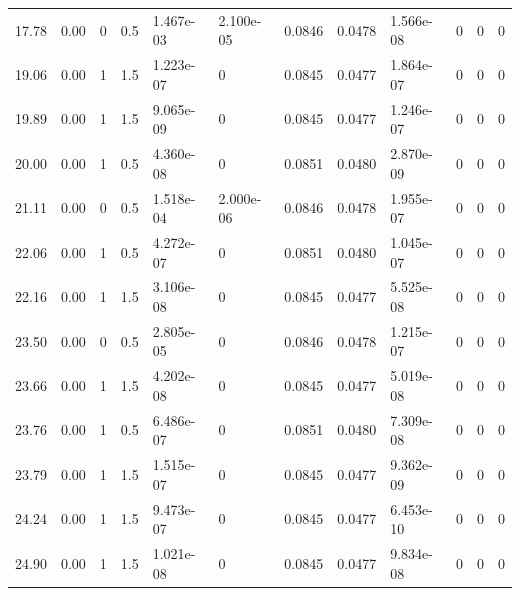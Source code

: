 \documentclass[preview]{standalone}
\begin{document}
{{\begin{tabular}{L{1.2cm}C{1.2cm} C{0.3cm}C{0.5cm} C{1.4cm}C{1.4cm} C{1.4cm}C{1.4cm} C{1.6cm}C{1.6cm} C{1.6cm}C{1.6cm}}
  17.78  &  0.00  & 0     & 0.5 &  1.467e-03  & 2.100e-05  &  0.0846&   0.0478& 1.566e-08 & 0   &  0 & 0  \\ 
  19.06  &  0.00  & 1     & 1.5 &  1.223e-07  & 0  &  0.0845&   0.0477& 1.864e-07 & 0   &  0 & 0  \\ 
  19.89  &  0.00  & 1     & 1.5 &  9.065e-09  & 0  &  0.0845&   0.0477& 1.246e-07 & 0   &  0 & 0  \\ 
  20.00  &  0.00  & 1     & 0.5 &  4.360e-08  & 0  &  0.0851&   0.0480& 2.870e-09 & 0   &  0 & 0  \\ 
  21.11  &  0.00  & 0     & 0.5 &  1.518e-04  & 2.000e-06  &  0.0846&   0.0478& 1.955e-07 & 0   &  0 & 0  \\ 
  22.06  &  0.00  & 1     & 0.5 &  4.272e-07  & 0  &  0.0851&   0.0480& 1.045e-07 & 0   &  0 & 0  \\ 
  22.16  &  0.00  & 1     & 1.5 &  3.106e-08  & 0  &  0.0845&   0.0477& 5.525e-08 & 0   &  0 & 0  \\ 
  23.50  &  0.00  & 0     & 0.5 &  2.805e-05  & 0  &  0.0846&   0.0478& 1.215e-07 & 0   &  0 & 0  \\ 
  23.66  &  0.00  & 1     & 1.5 &  4.202e-08  & 0  &  0.0845&   0.0477& 5.019e-08 & 0   &  0 & 0  \\ 
  23.76  &  0.00  & 1     & 0.5 &  6.486e-07  & 0  &  0.0851&   0.0480& 7.309e-08 & 0   &  0 & 0  \\ 
  23.79  &  0.00  & 1     & 1.5 &  1.515e-07  & 0  &  0.0845&   0.0477& 9.362e-09 & 0   &  0 & 0  \\ 
  24.24  &  0.00  & 1     & 1.5 &  9.473e-07  & 0  &  0.0845&   0.0477& 6.453e-10 & 0   &  0 & 0  \\ 
  24.90  &  0.00  & 1     & 1.5 &  1.021e-08  & 0  &  0.0845&   0.0477& 9.834e-08 & 0   &  0 & 0  \\ 
\hline 
\end{tabular} 

}}
\end{document}
